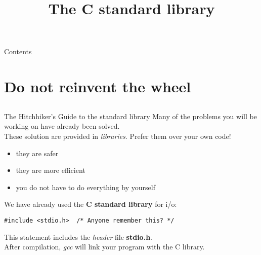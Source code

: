 \usepackage{tikz}
\newcommand{\topic}{
	The C standard library
}
\newcommand{\tikzcompiling}[2]{
\begin{tikzpicture}[scale=#1,font=#2]
	\node (main) [rectangle,draw,inner sep=1em] at (0,0){main.c};
	\node (libc) [rectangle,draw,inner sep=1em] at (5,-3){libc.so};
	\node (stdio) [rectangle,draw,inner sep=1em] at (5,0){stdio.h};
	\node (maino) [rectangle,draw,inner sep=1em] at (0,-3){main.o};
	\node (aout) [rectangle,draw,inner sep=1em] at (2.5,-6){a.out};
	\node at (aout) [above=1.5em] {linking};
	\draw[->] (main) -- (maino) node [left,align=right,midway,text width=5em] {compiling, assembling};
	\draw[->,dotted] (main) -- (stdio) node [above,midway] {includes};
	\draw[->,dotted] (stdio) -- (libc) node [right,midway] {implementation};
	\draw[->] (libc) -- (aout);
	\draw[->] (maino) -- (aout);
\end{tikzpicture}
}

\title{\topic}
\supertitle{\course}
\date{}



\maketitle

\begin{frame}{Contents}
	\tableofcontents
\end{frame}

\section{Do not reinvent the wheel}
\subsection{}

\begin{frame}[fragile]{The Hitchhiker's Guide to the standard library}
	Many of the problems you will be working on have already been solved.\\
	\bigskip
	These solution are provided in \textit{libraries}. Prefer them over your own code!\\
	\begin{itemize}
		\item they are safer
		\item they are more efficient
		\item you do not have to do everything by yourself
	\end{itemize}
	\bigskip
	We have already used the \textbf{C standard library} for i/o:
\begin{lstlisting}[numbers=none]
#include <stdio.h>	/* Anyone remember this? */
\end{lstlisting}
	This statement includes the \textit{header} file \textbf{stdio.h}.\\
	After compilation, \textit{gcc} will link your program with the C library.\\
\end{frame}
